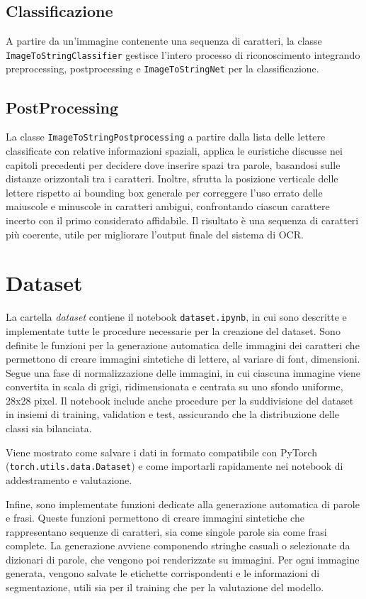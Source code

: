 \subsection{Classificazione}
A partire da un'immagine contenente una sequenza di caratteri, la classe \texttt{ImageToStringClassifier} gestisce l'intero processo di riconoscimento integrando preprocessing, postprocessing e \texttt{ImageToStringNet} per la classificazione.

\subsection{PostProcessing}
La classe \texttt{ImageToStringPostprocessing} a partire dalla lista delle lettere classificate con relative informazioni spaziali, applica le euristiche discusse nei capitoli precedenti per decidere dove inserire spazi tra parole, basandosi sulle distanze orizzontali tra i caratteri. Inoltre, sfrutta la posizione verticale delle lettere rispetto ai bounding box generale per correggere l'uso errato delle maiuscole e minuscole in caratteri ambigui, confrontando ciascun carattere incerto con il primo considerato affidabile. Il risultato è una sequenza di caratteri più coerente, utile per migliorare l'output finale del sistema di OCR.

\section{Dataset}
La cartella \emph{dataset} contiene il notebook \texttt{dataset.ipynb}, in cui sono descritte e implementate tutte le procedure necessarie per la creazione del dataset.
Sono definite le funzioni per la generazione automatica delle immagini dei caratteri che permettono di creare immagini sintetiche di lettere, al variare di font, dimensioni.
Segue una fase di normalizzazione delle immagini, in cui ciascuna immagine viene convertita in scala di grigi, ridimensionata e centrata su uno sfondo uniforme, 28x28 pixel. Il notebook include anche procedure per la suddivisione del dataset in insiemi di training, validation e test, assicurando che la distribuzione delle classi sia bilanciata.

Viene mostrato come salvare i dati in formato compatibile con PyTorch (\texttt{torch.utils.data.Dataset}) e come importarli rapidamente nei notebook di addestramento e valutazione.

Infine, sono implementate funzioni dedicate alla generazione automatica di parole e frasi. Queste funzioni permettono di creare immagini sintetiche che rappresentano sequenze di caratteri, sia come singole parole sia come frasi complete. La generazione avviene componendo stringhe casuali o selezionate da dizionari di parole, che vengono poi renderizzate su immagini. Per ogni immagine generata, vengono salvate le etichette corrispondenti e le informazioni di segmentazione, utili sia per il training che per la valutazione del modello.
